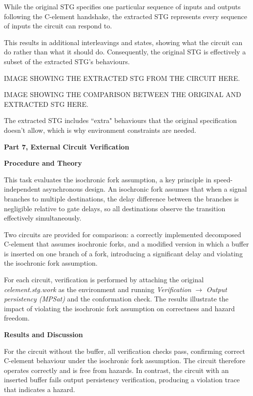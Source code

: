 \documentclass[a4paper,12pt]{article}
\begin{document}
While the original STG specifies one particular sequence of inputs and outputs following the C-element handshake, the extracted STG represents every sequence of inputs the circuit can respond to. 

This results in additional interleavings and states, showing what the circuit can do rather than what it should do. Consequently, the original STG is effectively a subset of the extracted STG's behaviours.

\begin{large}
    IMAGE SHOWING THE EXTRACTED STG FROM THE CIRCUIT HERE.
\end{large}

\begin{large}
    IMAGE SHOWING THE COMPARISON BETWEEN THE ORIGINAL AND EXTRACTED STG HERE.
\end{large}

The extracted STG includes ``extra" behaviours that the original specification doesn't allow, which is why environment constraints are needed.

\textbf{Part 7, External Circuit Verification}

\textbf{Procedure and Theory}

This task evaluates the isochronic fork assumption, a key principle in speed-independent asynchronous design. An isochronic fork assumes that when a signal branches to multiple destinations, the delay difference between the branches is negligible relative to gate delays, so all destinations observe the transition effectively simultaneously. 

Two circuits are provided for comparison: a correctly implemented decomposed C-element that assumes isochronic forks, and a modified version in which a buffer is inserted on one branch of a fork, introducing a significant delay and violating the isochronic fork assumption. 

For each circuit, verification is performed by attaching the original \textit{celement.stg.work} as the environment and running \textit{Verification} $\rightarrow$ \textit{Output persistency (MPSat)} and the conformation check. The results illustrate the impact of violating the isochronic fork assumption on correctness and hazard freedom.

\textbf{Results and Discussion}

For the circuit without the buffer, all verification checks pass, confirming correct C-element behaviour under the isochronic fork assumption. The circuit therefore operates correctly and is free from hazards. In contrast, the circuit with an inserted buffer fails output persistency verification, producing a violation trace that indicates a hazard.
\end{document}
